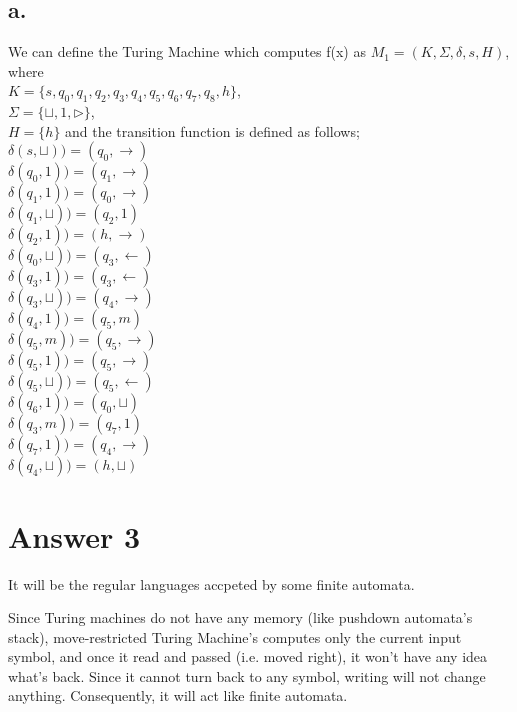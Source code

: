 \documentclass[12pt]{article}
\begin{document}
\subsection*{a.}
We can define the Turing Machine which computes f(x) as $M_1 = (K, \Sigma, \delta, s, H)$, where \\
$K =\{s, q_0, q_1, q_2, q_3, q_4, q_5, q_6, q_7,q_8, h\}$,\\
$ \Sigma = \{ \sqcup, 1, \triangleright \}$,\\
$H = \{h\}$ and the transition function is defined as follows; \\
$\delta(s, \sqcup) )= (q_0, \rightarrow)$\\
$\delta(q_0, 1) ) =(q_1, \rightarrow)$\\
$\delta(q_1, 1) )= (q_0, \rightarrow)$\\
$\delta(q_1, \sqcup) )= (q_2, 1)$\\
$\delta(q_2, 1) )= (h, \rightarrow)$\\
$\delta(q_0, \sqcup) )= (q_3, \leftarrow)$\\
$\delta(q_3, 1) )= (q_3, \leftarrow)$\\
$\delta(q_3, \sqcup) )= (q_4, \rightarrow)$\\
$\delta(q_4, 1) ) =(q_5, m)$\\
$\delta(q_5, m) ) =(q_5, \rightarrow)$\\
$\delta(q_5, 1) ) =(q_5, \rightarrow)$\\
$\delta(q_5, \sqcup) )= (q_5, \leftarrow)$\\
$\delta(q_6, 1) ) =(q_0, \sqcup)$\\
$\delta(q_3, m) ) =(q_7, 1)$\\
$\delta(q_7, 1) ) =(q_4, \rightarrow)$\\
$\delta(q_4, \sqcup) )= (h, \sqcup)$\\

\section*{Answer 3}
It will be the regular languages accpeted by some finite automata.

Since Turing machines do not have  any  memory (like pushdown automata's stack), move-restricted Turing Machine's computes only the current input symbol, and once it read and passed (i.e. moved right),  it won't have any idea what's back. Since it cannot turn back to any symbol, writing will not change anything. Consequently, it will act like finite automata.
\end{document}
